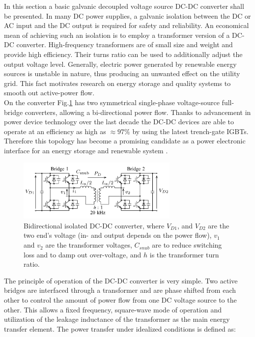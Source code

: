 {In this section a basic galvanic decoupled voltage source DC-DC converter shall be presented. In many DC power supplies, a galvanic isolation between the DC or AC input and the DC output is required for safety and reliability. An economical mean of achieving such an isolation is to employ a transformer version of a DC-DC converter. High-frequency transformers are of small size and weight and provide high efficiency. Their turns ratio can be used to additionally adjust the output voltage level. Generally, electric power generated by renewable energy sources is unstable in nature, thus producing an unwanted effect on the utility grid. This fact motivates research on energy storage and quality systems to smooth out active-power flow.\\
On the converter Fig.\ref{BASICCSR:fig:DCDCGalvanic} has two symmetrical single-phase voltage-source full-bridge converters, allowing a bi-directional power flow. Thanks to advancement in power device technology over the last decade the DC-DC devices are able to operate at an efficiency as high as $\approx97\%$ by using the latest trench-gate IGBTs. Therefore this topology has become a promising candidate as a power electronic interface for an energy storage and renewable system \cite{kheraluwala1992performance} \cite{inoue2007bidirectional}.


\begin{figure}[!ht]
        \centering
        \includegraphics[width=0.7\textwidth]{EMPC_PNG_Pics/DC_DC_galvanic.png}
        \caption{Bidirectional isolated DC-DC converter, where $V_{D1}$, and $V_{D2}$ are the two end's voltage (in- and output depends on the power flow), $v_1$ and $v_2$ are the transformer voltages, $C_{snub}$ are to reduce switching loss and to damp out
over-voltage, and $h$ is the transformer turn ratio.}
        \label{BASICCSR:fig:DCDCGalvanic}
    \end{figure}
		
The principle of operation of the DC-DC converter is very simple. Two active bridges are interfaced through a transformer and are phase shifted from each other to control the amount of power flow from one DC voltage source to the other. This allows a fixed frequency, square-wave mode of operation and utilization of the leakage inductance of the transformer as the main energy transfer element. The power transfer under idealized conditions is defined as:

}
